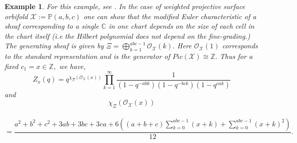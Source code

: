 \documentclass[10pt]{amsart}
\newtheorem{example}{Example}
\newcommand{\sO}{{\mathcal O}}
\newcommand{\sX}{{\mathcal X}}
\numberwithin{equation}{subsection}
\begin{document}
\begin{example}
For this example, see \cite{GJK}.
In the case of weighted projective surface orbifold $\sX:=\mathbb{P}(a,b,c)$ one can show that the modified Euler characteristic of a sheaf corresponding to a single $\mathbb{C}$ in one chart depends on the size of each cell in the chart itself (i.e the Hilbert polynomial does not depend on the fine-grading.) The generating sheaf is given by $\Xi=\bigoplus_{k=1}^{abc-1}\sO_{\sX}(k).$ Here $\sO_{\sX}(1)$ corresponds to the standard representation and is the generator of $Pic({\sX})\cong \mathbb{Z}.$ Thus for a fixed $c_1=x \in \mathbb{Z},$ we have,
$$Z_{x}(q)=q^{\chi_{\Xi}(\sO_{\sX}(x))}\prod_{k=1}^{\infty}\frac{1}{(1-q^{-abk})(1-q^{-bck})(1-q^{cak})}$$ and
$$\chi_{\Xi}(\sO_{\sX}(x))$$\\
$$=\frac{a^2+b^2+c^2+3ab+3bc+3ca+6((a+b+c)\sum_{k=0}^{abc-1}(x+k)+\sum_{k=0}^{abc-1}(x+k)^2)}{12}.$$
\end{example}















\end{document}
